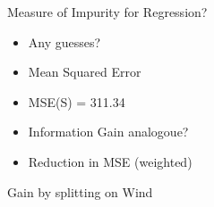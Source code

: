 \documentclass[usenames,dvipsnames]{beamer}
\begin{document}
\begin{frame}{Measure of Impurity for Regression?}
\begin{itemize}
	\item \pause Any guesses?
	\item \pause Mean Squared Error
	\item \pause MSE(S) = 311.34
	\item \pause Information Gain analogoue?
	\item \pause Reduction in MSE (weighted)
\end{itemize}

\end{frame}

\begin{frame}{Gain by splitting on Wind}
\begin{columns}

\begin{column}{.5\textwidth}
	\begin{scriptsize}


\end{scriptsize}
\end{column}
\end{columns}
\end{frame}
\end{document}
